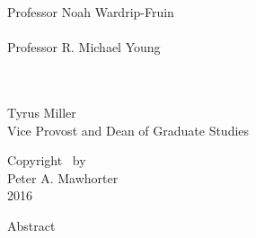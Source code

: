 \begin{titlepage}
{\hspace*{5em}Professor Noah Wardrip-Fruin \vspace{2.25\baselineskip} \\
\hspace*{5em}\underline{\hspace{20em}} \\
\hspace*{5em}Professor R. Michael Young \\
} \vspace{2.25\baselineskip} \\
\raggedright
\underline{\hspace{20em}} \\
Tyrus Miller \\
Vice Provost and Dean of Graduate Studies%
\end{titlepage}

\newpage

\centering
{}
\thispagestyle{empty}
\vspace*{\fill}
Copyright \textcopyright~by \\
Peter A. Mawhorter \\
2016 \\
\vspace*{\fill}
\newpage
\justifying

{\let\cleardoublepage\clearpage
{}
\tableofcontents

\listoffigures

\listoftables
}

\newpage
{}

\vspace{0.5em}
{
\huge
\centering
Abstract \\
}
\vspace*{1em}


\addtolength{\baselineskip}{0pt plus 1pt minus 1pt}



\cleardoublepage
